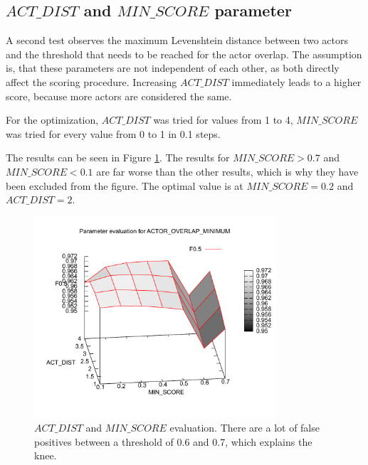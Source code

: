 \subsection{$ACT\_DIST$ and $MIN\_SCORE$ parameter}
A second test observes the maximum Levenshtein distance between two actors and the threshold that needs to be reached for the actor overlap.
The assumption is, that these parameters are not independent of each other, as both directly affect the scoring procedure.
Increasing $ACT\_DIST$ immediately leads to a higher score, because more actors are considered the same.

For the optimization, $ACT\_DIST$ was tried for values from 1 to 4, $MIN\_SCORE$ was tried for every value from 0 to 1 in 0.1 steps.

The results can be seen in Figure \ref{fig_3d}.
The results for $MIN\_SCORE > 0.7$ and $MIN\_SCORE < 0.1$ are far worse than the other results, which is why they have been excluded from the figure.
The optimal value is at $MIN\_SCORE = 0.2$ and $ACT\_DIST = 2$.

\begin{figure}[h!]
  \begin{center}
  \includegraphics[width=0.8\textwidth]{images/3d.pdf}
  \end{center}
  \caption{$ACT\_DIST$  and $MIN\_SCORE$ evaluation. There are a lot of false positives between a threshold of 0.6 and 0.7, which explains the knee.}
  \label{fig_3d}
\end{figure}



